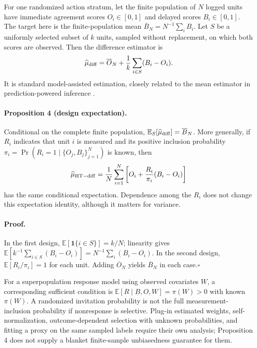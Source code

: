 For one randomized action stratum, let the finite population of $N$ logged
units have immediate agreement scores $O_i\in[0,1]$ and delayed scores
$B_i\in[0,1]$. The target here is the finite-population mean
$\overline B_N=N^{-1}\sum_i B_i$. Let $S$ be a uniformly selected subset of
$k$ units, sampled without replacement, on which both scores are observed.
Then the difference estimator is
\begin{equation}
 \widehat\mu_{\rm diff}=\overline O_N+
 \frac1k\sum_{i\in S}(B_i-O_i).
 \label{eq:theory:difference}
\end{equation}
It is standard model-assisted estimation, closely related to the mean
estimator in prediction-powered inference
\citep{ppi,mozer2026difference}.

\paragraph{Proposition 4 (design expectation).}
Conditional on the complete finite population,
$\mathbb E_S[\widehat\mu_{\rm diff}]=\overline B_N$. More generally, if
$R_i$ indicates that unit $i$ is measured and its positive inclusion
probability $\pi_i=\Pr(R_i=1\mid\{O_j,B_j\}_{j=1}^N)$ is known, then
\begin{equation}
 \widehat\mu_{\rm HT-diff}=\frac1N\sum_{i=1}^N
 \left[O_i+\frac{R_i}{\pi_i}(B_i-O_i)\right]
 \label{eq:theory:ht-difference}
\end{equation}
has the same conditional expectation. Dependence among the $R_i$ does not
change this expectation identity, although it matters for variance.

\paragraph{Proof.}
In the first design, $\mathbb E[\mathbf1\{i\in S\}]=k/N$; linearity gives
$\mathbb E[k^{-1}\sum_{i\in S}(B_i-O_i)]
=N^{-1}\sum_i(B_i-O_i)$. In the second design,
$\mathbb E[R_i/\pi_i]=1$ for each unit. Adding $\overline O_N$ yields
$\overline B_N$ in each case.\hfill$\square$

For a superpopulation response model using observed covariates $W$, a
corresponding sufficient condition is
$\mathbb E[R\mid B,O,W]=\pi(W)>0$ with known $\pi(W)$. A randomized
invitation probability is not the full measurement-inclusion probability
if nonresponse is selective. Plug-in estimated weights, self-normalization,
outcome-dependent selection with unknown probabilities, and fitting a proxy
on the same sampled labels require their own analysis; Proposition 4 does
not supply a blanket finite-sample unbiasedness guarantee for them.

